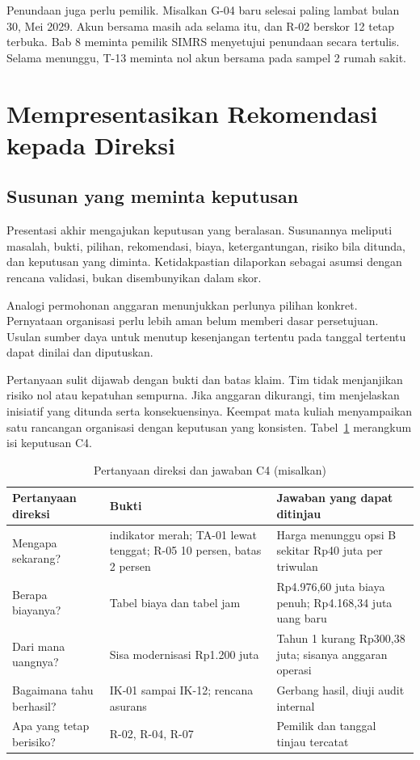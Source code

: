 Penundaan juga perlu pemilik. Misalkan G-04 baru selesai paling lambat bulan 30, Mei 2029. Akun
bersama masih ada selama itu, dan R-02 berskor 12 tetap terbuka. Bab 8 meminta pemilik SIMRS
menyetujui penundaan secara tertulis. Selama menunggu, T-13 meminta nol akun bersama pada sampel 2
rumah sakit.

\section{Mempresentasikan Rekomendasi kepada Direksi}

\subsection*{Susunan yang meminta keputusan}

Presentasi akhir mengajukan keputusan yang beralasan. Susunannya meliputi masalah, bukti, pilihan,
rekomendasi, biaya, ketergantungan, risiko bila ditunda, dan keputusan yang diminta. Ketidakpastian
dilaporkan sebagai asumsi dengan rencana validasi, bukan disembunyikan dalam skor.

Analogi permohonan anggaran menunjukkan perlunya pilihan konkret. Pernyataan organisasi perlu lebih
aman belum memberi dasar persetujuan. Usulan sumber daya untuk menutup kesenjangan tertentu pada
tanggal tertentu dapat dinilai dan diputuskan.

Pertanyaan sulit dijawab dengan bukti dan batas klaim. Tim tidak menjanjikan risiko nol atau
kepatuhan sempurna. Jika anggaran dikurangi, tim menjelaskan inisiatif yang ditunda serta
konsekuensinya. Keempat mata kuliah menyampaikan satu rancangan organisasi dengan keputusan yang
konsisten. Tabel~\ref{tab:ch14-presentasi} merangkum isi keputusan C4.

\begin{table}[!htb]
  \centering\small
  \caption{Pertanyaan direksi dan jawaban C4 (misalkan)}\label{tab:ch14-presentasi}
  \begin{tabularx}{\textwidth}{|>{\raggedright\arraybackslash}p{}|>{\raggedright\arraybackslash}X|>{\raggedright\arraybackslash}X|}
    \hline
    \textbf{Pertanyaan direksi} & \textbf{Bukti} & \textbf{Jawaban yang dapat ditinjau} \\ \hline
    Mengapa sekarang? & 3 indikator merah; TA-01 lewat tenggat; R-05 10 persen, batas 2 persen &
    Harga menunggu opsi B sekitar Rp40 juta per triwulan \\ \hline
    Berapa biayanya? & Tabel biaya dan tabel jam & Rp4.976,60 juta biaya penuh; Rp4.168,34 juta uang
    baru \\ \hline
    Dari mana uangnya? & Sisa modernisasi Rp1.200 juta & Tahun 1 kurang Rp300,38 juta; sisanya
    anggaran operasi \\ \hline
    Bagaimana tahu berhasil? & IK-01 sampai IK-12; rencana asurans & Gerbang hasil, diuji audit
    internal \\ \hline
    Apa yang tetap berisiko? & R-02, R-04, R-07 & Pemilik dan tanggal tinjau tercatat \\ \hline
  \end{tabularx}
\end{table}

